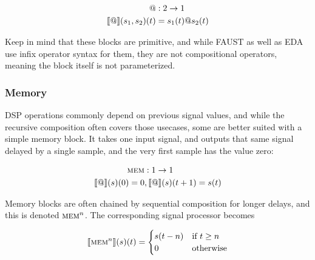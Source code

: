 \begin{minipage}{0.5\linewidth}
  \begin{align*}
    @                     & : 2 \rightarrow 1 \\
    \llbracket @ \rrbracket(s_1, s_2)(t) & = s_1(t) @ s_2(t) \\
  \end{align*}
\end{minipage}
\begin{minipage}{0.5\linewidth}
  \begin{figure}[H]
    \centering
    \label{fig:block_arithmetic}
    
  \end{figure}
\end{minipage}

Keep in mind that these blocks are primitive, and while FAUST as well as EDA use infix operator syntax for
them, they are not compositional operators, meaning the block itself is not parameterized.

\subsubsection{Memory}

DSP operations commonly depend on previous signal values, and while the recursive composition often covers
those usecases, some are better suited with a simple memory block. It takes one input signal, and outputs
that same signal delayed by a single sample, and the very first sample has the value zero:

\begin{minipage}{0.5\linewidth}
  \begin{align*}
    \textsc{mem}               & : 1 \rightarrow 1           \\
    \llbracket @ \rrbracket(s)(0) = 0 & , \llbracket @ \rrbracket(s)(t + 1) = s(t) \\
  \end{align*}
\end{minipage}
\begin{minipage}{0.5\linewidth}
  \begin{figure}[H]
    \centering
    \label{fig:block_mem}
    
  \end{figure}
\end{minipage}

Memory blocks are often chained by sequential composition for longer delays, and this is denoted
$\textsc{mem}^n$. The corresponding signal processor becomes

\[
  \llbracket \textsc{mem}^n \rrbracket(s)(t) =
  \begin{cases}
    s(t - n) & \text{if } t \geq n \\
    0        & \text{otherwise}
  \end{cases}
\]

